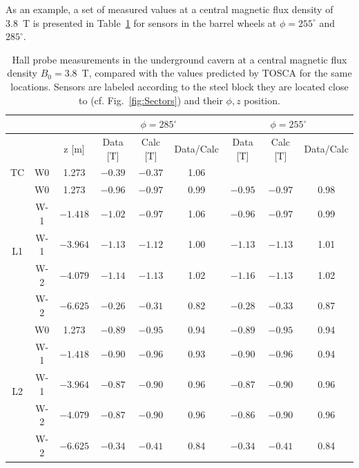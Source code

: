 As an example, a set of measured values at a central magnetic flux density of
3.8~T is presented in Table~\ref{tab:Hall} for sensors in the barrel
wheels at $\phi=255^{\circ}$ and $285^{\circ}$.
\begin{table}
\caption{Hall probe measurements in the underground cavern at a central
  magnetic flux density $B_0=3.8$~T,
  compared with the values predicted by TOSCA for the same locations.
  Sensors are labeled according to the steel block they are located
  close to (cf. Fig.~\ref{fig:Sectors}) and their $\phi, z$ position.
}
\label{tab:Hall}

\begin{center}
\begin{tabular}{cc|c|ccc|ccc}
\hline
\multicolumn{3}{c|}{\mbox{}} & \multicolumn{3}{c|}{$\phi=285^{\circ}$} & \multicolumn{3}{c}{$\phi=255^{\circ}$}\\
\hline
\multicolumn{2}{c|}{\mbox{}}  &  z [m] &
Data [T] & Calc [T] & Data/Calc & Data [T] & Calc [T] & Data/Calc\\
\hline
\multirow{1}{*}{TC}

& W0  &  1.273 & $-0.39$ & $-0.37$ & 1.06 & & &\\
\hline
\multirow{5}{*}{L1}
& W0  &  1.273   & $-0.96$ & $-0.97$ & 0.99 & $-0.95$ & $-0.97$ & 0.98 \\
& W-1 & $-1.418$ & $-1.02$ & $-0.97$ & 1.06 & $-0.96$ & $-0.97$ & 0.99 \\
& W-1 & $-3.964$ & $-1.13$ & $-1.12$ & 1.00 & $-1.13$ & $-1.13$ & 1.01 \\
& W-2 & $-4.079$ & $-1.14$ & $-1.13$ & 1.02 & $-1.16$ & $-1.13$ & 1.02 \\
& W-2 & $-6.625$ & $-0.26$ & $-0.31$ & 0.82 & $-0.28$ & $-0.33$ & 0.87 \\

\hline
\multirow{5}{*}{L2}
& W0  &  1.273   & $-0.89$ & $-0.95$ & 0.94 & $-0.89$ & $-0.95$ & 0.94 \\
& W-1 & $-1.418$ & $-0.90$ & $-0.96$ & 0.93 & $-0.90$ & $-0.96$ & 0.94 \\
& W-1 & $-3.964$ & $-0.87$ & $-0.90$ & 0.96 & $-0.87$ & $-0.90$ & 0.96 \\
& W-2 & $-4.079$ & $-0.87$ & $-0.90$ & 0.96 & $-0.86$ & $-0.90$ & 0.96 \\
& W-2 & $-6.625$ & $-0.34$ & $-0.41$ & 0.84 & $-0.34$ & $-0.41$ & 0.84 \\


\end{tabular}
\end{center}
\end{table}
